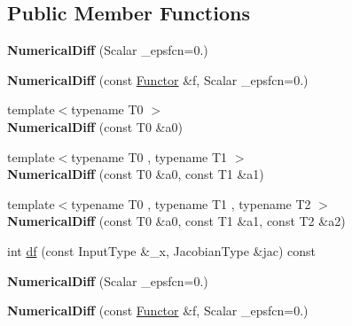 \subsection*{Public Member Functions}
\begin{DoxyCompactItemize}
\item 
\mbox{\label{class_eigen_1_1_numerical_diff_a6d01a39fbc70fdcdeb5ac62b29102543}} 
{\bfseries Numerical\+Diff} (Scalar \+\_\+epsfcn=0.)
\item 
\mbox{\label{class_eigen_1_1_numerical_diff_a01850ed47501236ecbb06186305c2884}} 
{\bfseries Numerical\+Diff} (const \hyperlink{struct_functor}{Functor} \&f, Scalar \+\_\+epsfcn=0.)
\item 
\mbox{\label{class_eigen_1_1_numerical_diff_aa0c9b360ead36c6ecb822776549b57bf}} 
{\footnotesize template$<$typename T0 $>$ }\\{\bfseries Numerical\+Diff} (const T0 \&a0)
\item 
\mbox{\label{class_eigen_1_1_numerical_diff_aff5b053135d4a9eb03e1ece6cd621f5f}} 
{\footnotesize template$<$typename T0 , typename T1 $>$ }\\{\bfseries Numerical\+Diff} (const T0 \&a0, const T1 \&a1)
\item 
\mbox{\label{class_eigen_1_1_numerical_diff_af08a8d5c3ea7bc1eb31c6776a161e1fc}} 
{\footnotesize template$<$typename T0 , typename T1 , typename T2 $>$ }\\{\bfseries Numerical\+Diff} (const T0 \&a0, const T1 \&a1, const T2 \&a2)
\item 
int \hyperlink{class_eigen_1_1_numerical_diff_a8fc63f1c3307cc6e61dc4d70c57b5037}{df} (const Input\+Type \&\+\_\+x, Jacobian\+Type \&jac) const
\item 
\mbox{\label{class_eigen_1_1_numerical_diff_a6d01a39fbc70fdcdeb5ac62b29102543}} 
{\bfseries Numerical\+Diff} (Scalar \+\_\+epsfcn=0.)
\item 
\mbox{\label{class_eigen_1_1_numerical_diff_a01850ed47501236ecbb06186305c2884}} 
{\bfseries Numerical\+Diff} (const \hyperlink{struct_functor}{Functor} \&f, Scalar \+\_\+epsfcn=0.)

\end{DoxyCompactItemize}
